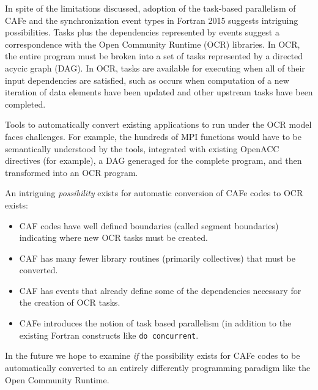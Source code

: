 In spite of the limitations discussed, 
adoption of the task-based parallelism of CAFe and the synchronization
event types in Fortran 2015 suggests intriguing possibilities.  Tasks plus the
dependencies represented by events suggest a correspondence with the Open Community
Runtime (OCR) libraries.  In OCR, the entire program must be broken into a set of tasks
represented by a directed acycic graph (DAG).  In OCR, tasks are available for executing
when all of their input dependencies are satisfied, such as occurs when computation of a new
iteration of data elements have been updated and other upstream tasks have been completed.

Tools to automatically convert existing applications to run under the OCR model faces challenges.  For
example, the hundreds of MPI functions would have to be semantically understood by the tools,
integrated with existing OpenACC directives (for example), a DAG generaged for the complete
program, and then transformed into an OCR program.

An intriguing \emph{possibility} exists for automatic conversion of CAFe codes to OCR exists:
\begin{itemize}
\item
  CAF codes have well defined boundaries (called segment boundaries) indicating where new
  OCR tasks must be created.
\item
  CAF has many fewer library routines (primarily collectives) that must be converted.
\item
  CAF has events that already define some of the dependencies necessary for the creation
  of OCR tasks.
\item
  CAFe introduces the notion of task based parallelism (in addition to the existing
  Fortran constructs like \texttt{do concurrent}.
\end{itemize}

In the future we hope to examine \emph{if} the possibility exists for CAFe codes to be
automatically converted to an entirely differently programming paradigm like
the Open Community Runtime.

\begin{comment}
These choices often hide the opportunity for
optimizations by the compiler \cite{Dubey:2014:SSC:2686745.2686756}.
\end{comment}

